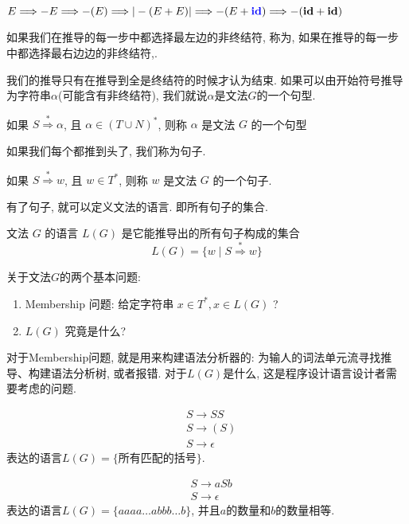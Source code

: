 \documentclass{ctexart}
\begin{document}
$E \Longrightarrow-E \Longrightarrow-(E) \Longrightarrow|-(E+E)| \Longrightarrow-(E+{{\color{blue}\mathbf{i d}}}) \Longrightarrow-(\mathbf{i d}+\mathbf{i d})$

如果我们在推导的每一步中都选择最左边的非终结符, 称为, 如果在推导的每一步中都选择最右边边的非终结符,. 

我们的推导只有在推导到全是终结符的时候才认为结束. 如果可以由开始符号推导为字符串$\alpha$(可能含有非终结符), 我们就说$\alpha$是文法$G$的一个句型. 

\begin{definition}
    如果 $S \stackrel{*}{\Rightarrow} \alpha$, 且 $\alpha \in(T \cup N)^*$, 则称 $\alpha$ 是文法 $G$ 的一个句型
\end{definition}

如果我们每个都推到头了, 我们称为句子. 

\begin{definition}
    如果 $S \stackrel{*}{\Rightarrow} w$, 且 $w \in T^*$, 则称 $w$ 是文法 $G$ 的一个句子. 
\end{definition}

有了句子, 就可以定义文法的语言. 即所有句子的集合. 

\begin{definition}[文法$G$生成的语言$L(G)$]
    文法 $G$ 的语言 $L(G)$ 是它能推导出的所有句子构成的集合
$$
L(G)=\{w \mid S \stackrel{*}{\Rightarrow} w\}
$$
\end{definition}

关于文法$G$的两个基本问题: 

\begin{enumerate}
    \item Membership 问题: 给定字符串 $x \in T^*, x \in L(G)$ ?
    \item $L(G)$ 究竟是什么?
\end{enumerate}

对于Membership问题, 就是用来构建语法分析器的: 为输人的词法单元流寻找推导、构建语法分析树, 或者报错. 对于$L(G)$是什么, 这是程序设计语言设计者需要考虑的问题. 

\begin{example}
    $$\begin{aligned} & S \rightarrow S S \\ & S \rightarrow(S) \\ & S \rightarrow \epsilon\end{aligned}$$
    表达的语言$L(G)=\{\text{所有匹配的括号}\}$. 

    $$
\begin{aligned}
&S \rightarrow a S b\\
&S \rightarrow \epsilon
\end{aligned}
$$
表达的语言$L(G)=\{aaaa\dots abbb\dots b\}$, 并且$a$的数量和$b$的数量相等.  


\end{example}
\end{document}
